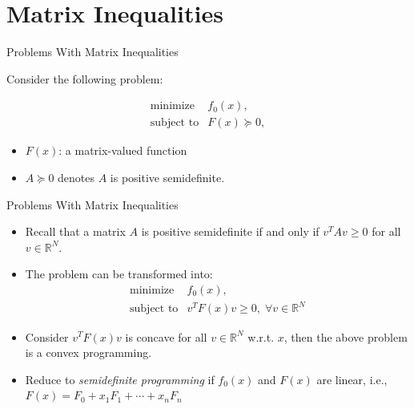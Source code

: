 \documentclass[10pt,ignorenonframetext,serif,onlymath]{beamer}
\providecommand{\tightlist}{%
  \setlength{\itemsep}{0pt}\setlength{\parskip}{0pt}}
\begin{document}
\hypertarget{sec:matrix-inequalities}{%
\section{Matrix Inequalities}\label{sec:matrix-inequalities}}

\begin{frame}{Problems With Matrix Inequalities}
\protect\hypertarget{sec:problems-with-matrix-inequalities}{}

Consider the following problem:

\[\begin{array}{ll}
    \text{minimize}    & f_0(x), \\
    \text{subject to}  & F(x) \succeq 0,
\end{array}\]

\begin{itemize}
\tightlist
\item
  \(F(x)\): a matrix-valued function
\item
  \(A \succeq 0\) denotes \(A\) is positive semidefinite.
\end{itemize}

\end{frame}

\begin{frame}{Problems With Matrix Inequalities}
\protect\hypertarget{sec:problems-with-matrix-inequalities-1}{}

\begin{itemize}
\tightlist
\item
  Recall that a matrix \(A\) is positive semidefinite if and only if
  \(v^T A v \ge 0\) for all \(v \in \mathbb{R}^N\).
\item
  The problem can be transformed into: \[\begin{array}{ll}
            \text{minimize}      & f_0(x), \\
            \text{subject to}    & v^T F(x) v \ge 0, \; \forall v \in \mathbb{R}^N
    \end{array}\]
\item
  Consider \(v^T F(x) v\) is concave for all \(v \in \mathbb{R}^N\)
  w.r.t. \(x\), then the above problem is a convex programming.
\item
  Reduce to \emph{semidefinite programming} if \(f_0(x)\) and \(F(x)\)
  are linear, i.e., \(F(x) = F_0 + x_1 F_1 + \cdots + x_n F_n\)
\end{itemize}

\end{frame}
\end{document}
